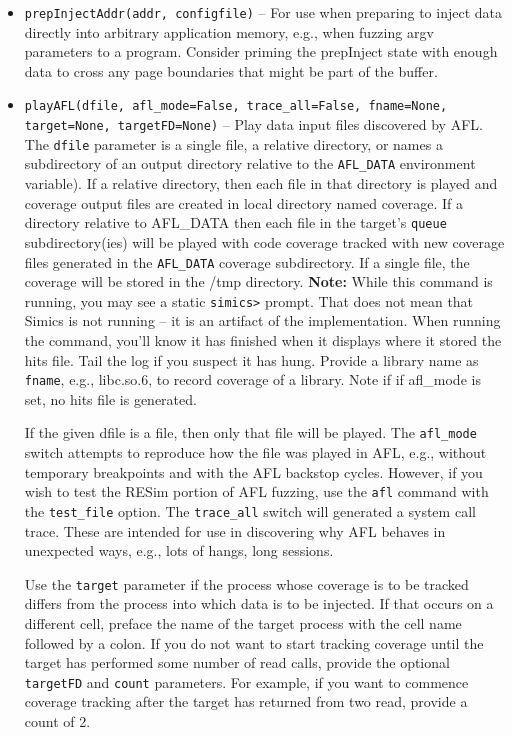 \documentclass[titlepage]{article}
\begin{document}
\begin{itemize}
\item{\tt prepInjectAddr(addr, configfile)} -- For use when preparing to inject data directly into arbitrary application memory, e.g., when fuzzing argv parameters
to a program.  Consider priming the prepInject state with enough data to cross any page boundaries that might be part of the buffer.

\item{\tt playAFL(dfile, afl\_mode=False, trace\_all=False, fname=None, target=None, targetFD=None)} -- Play data input files discovered by AFL.  The {\tt dfile} parameter 
is a single file, a relative directory, or names a subdirectory of an output directory relative to the {\tt AFL\_DATA} environment variable).  
If a relative directory, then each file in that directory is played and coverage output files are created in local directory named coverage.
If a directory relative to AFL\_DATA then each file in the target's {\tt queue} subdirectory(ies) will be played with code coverage tracked with new coverage files generated in the {\tt AFL\_DATA} 
coverage subdirectory.  If a single file, the coverage will be stored in the /tmp directory.
\textbf{Note:} While this command is running, you may see a static {\tt simics>} prompt.  That does not mean that Simics is not running -- it is an artifact of the implementation.  When running the command, you'll know it has finished when it displays where it stored the hits file.
Tail the log if you suspect it has hung.  Provide a library name as {\tt fname}, e.g., libc.so.6, to record coverage of a library.  Note if if afl\_mode is set, no hits file is generated.

If the given dfile is a file, then only that file will be played.  The {\tt afl\_mode} switch attempts to reproduce how the file was played in AFL, e.g., without temporary
breakpoints and with the AFL backstop cycles. However, if you wish to test the RESim portion of AFL fuzzing, use the {\tt afl} command with the {\tt test\_file} option.  
The {\tt trace\_all} switch will generated a system call trace.  These are intended for use in discovering why AFL
behaves in unexpected ways, e.g., lots of hangs, long sessions.

Use the {\tt target} parameter if the process whose coverage is to be tracked differs from the process into which data is to be injected.  If that occurs
on a different cell, preface the name of the target process with the cell name followed by a colon.  If you do not want to start tracking coverage
until the target has performed some number of read calls, provide the optional {\tt targetFD} and {\tt count} parameters.  For example, if you want to
commence coverage tracking after the target has returned from two read, provide a count of 2.


\end{itemize}
\end{document}
